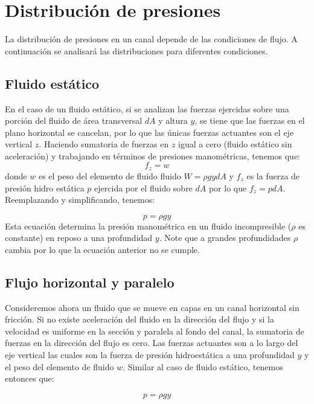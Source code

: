 \documentclass[11pt, oneside]{article}
\begin{document}
\section{Distribuci\'on de presiones}%
La distribuci\'on de presiones en un canal depende de las condiciones de flujo. A continuaci\'on se analisar\'a las distribuciones para diferentes condiciones.

\subsection{Fluido est\'atico}
En el caso de un fluido est\'atico, si se analizan las fuerzas ejercidas sobre una porci\'on del fluido de \'area transversal $dA$ y altura $y$, se tiene que las fuerzas en el plano horizontal se cancelan, por lo que las únicas fuerzas actuantes son el eje vertical $z$. Haciendo sumatoria de fuerzas en $z$ igual a cero (fluido estático sin aceleraci\'on) y trabajando en términos de presiones manométricas, tenemos que:
$$
f_z = w
$$
donde $w$ es el peso del elemento de fluido fluido $W=\rho g y dA$ y $f_z$ es la fuerza de presi\'on hidro estática $p$ ejercida  por el fluido sobre $dA$ por lo que $f_z = p dA$. Reemplazando y simplificando, tenemos:

$$
p=\rho g y
$$
Esta ecuaci\'on determina la presi\'on manométrica en un fluido incompresible ($\rho$ es constante) en reposo a una profundidad $y$. Note que a grandes profundidades $\rho$ cambia por lo que la ecuaci\'on anterior no se cumple.

\subsection{Flujo horizontal y paralelo}
Consideremos ahora un fluido que se mueve en capas en un canal horizontal sin fricci\'on. Si  no existe aceleración del fluido en la direcci\'on del flujo y si la velocidad es uniforme en la secci\'on y paralela al fondo del canal, la sumatoria de fuerzas en la direcci\'on del flujo es cero. Las fuerzas actuantes son a lo largo del eje vertical las cuales son la fuerza de presi\'on hidroest\'atica a una profundidad $y$ y el peso del elemento de fluido $w$. Similar al caso de fluido est\'atico, tenemos entonces que:

$$
p=\rho g y
$$
 
\end{document}
